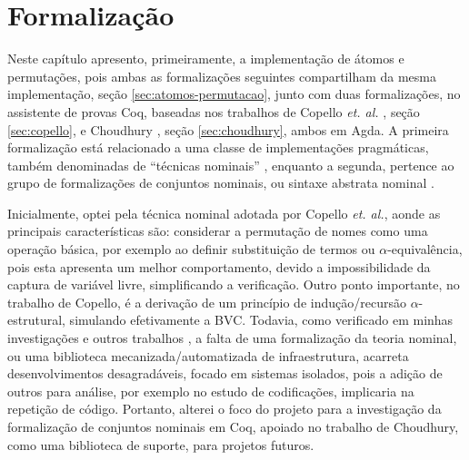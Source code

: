 \chapter{Formalização}\label{chp:formalizacao}

Neste capítulo apresento, primeiramente, a implementação de átomos e permutações, pois ambas as formalizações seguintes compartilham da mesma implementação, seção \ref{sec:atomos-permutacao}, junto com duas formalizações, no assistente de provas Coq, baseadas nos trabalhos de Copello \textit{et. al.} \cite{Copello2016}, seção \ref{sec:copello}, e Choudhury \cite{Choudhury2015}, seção \ref{sec:choudhury}, ambos em Agda. A primeira formalização está relacionado a uma classe de implementações pragmáticas, também denominadas de ``técnicas nominais'' \cite{Copello2016,Copello2018,Ambal2020,Tasistro2015,Aydemir2007}, enquanto a segunda, pertence ao grupo de formalizações de conjuntos nominais, ou sintaxe abstrata nominal \cite{AyalaRincon2019,Choudhury2015}.

Inicialmente, optei pela técnica nominal adotada por Copello \textit{et. al.}, aonde as principais características são: considerar a permutação de nomes como uma operação básica, por exemplo ao definir substituição de termos ou $\alpha$-equivalência, pois esta apresenta um melhor comportamento, devido a impossibilidade da captura de variável livre, simplificando a verificação. Outro ponto importante, no trabalho de Copello, é a derivação de um princípio de indução/recursão $\alpha$-estrutural, simulando efetivamente a BVC.
Todavia, como verificado em minhas investigações e outros trabalhos \cite{Aydemir2008}, a falta de uma formalização da teoria nominal, ou uma biblioteca mecanizada/automatizada de infraestrutura, acarreta desenvolvimentos desagradáveis, focado em sistemas isolados, pois a adição de outros para análise, por exemplo no estudo de codificações, implicaria na repetição de código. Portanto, alterei o foco do projeto para a investigação da formalização de conjuntos nominais em Coq, apoiado no trabalho de Choudhury, como uma biblioteca de suporte, para projetos futuros.


